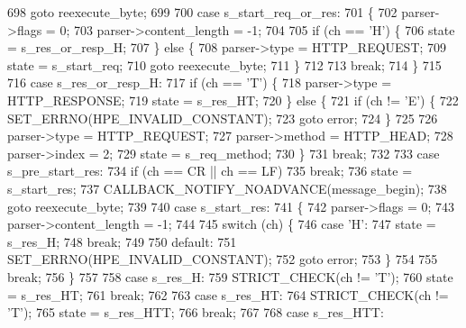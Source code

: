 \begin{DoxyCode}
698         \textcolor{keywordflow}{goto} reexecute\_byte;
699 
700       \textcolor{keywordflow}{case} s_start_req_or_res:
701       \{
702         parser->flags = 0;
703         parser->content_length = -1;
704 
705         \textcolor{keywordflow}{if} (ch == \textcolor{charliteral}{'H'}) \{
706           state = s_res_or_resp_H;
707         \} \textcolor{keywordflow}{else} \{
708           parser->type = HTTP_REQUEST;
709           state = s_start_req;
710           \textcolor{keywordflow}{goto} reexecute\_byte;
711         \}
712 
713         \textcolor{keywordflow}{break};
714       \}
715 
716       \textcolor{keywordflow}{case} s_res_or_resp_H:
717         \textcolor{keywordflow}{if} (ch == \textcolor{charliteral}{'T'}) \{
718           parser->type = HTTP_RESPONSE;
719           state = s_res_HT;
720         \} \textcolor{keywordflow}{else} \{
721           \textcolor{keywordflow}{if} (ch != \textcolor{charliteral}{'E'}) \{
722             SET_ERRNO(HPE_INVALID_CONSTANT);
723             \textcolor{keywordflow}{goto} error;
724           \}
725 
726           parser->type = HTTP_REQUEST;
727           parser->method = HTTP_HEAD;
728           parser->index = 2;
729           state = s_req_method;
730         \}
731         \textcolor{keywordflow}{break};
732 
733       \textcolor{keywordflow}{case} s_pre_start_res:
734         \textcolor{keywordflow}{if} (ch == CR || ch == LF)
735           \textcolor{keywordflow}{break};
736         state = s_start_res;
737         CALLBACK_NOTIFY_NOADVANCE(message\_begin);
738         \textcolor{keywordflow}{goto} reexecute\_byte;
739 
740       \textcolor{keywordflow}{case} s_start_res:
741       \{
742         parser->flags = 0;
743         parser->content_length = -1;
744 
745         \textcolor{keywordflow}{switch} (ch) \{
746           \textcolor{keywordflow}{case} \textcolor{charliteral}{'H'}:
747             state = s_res_H;
748             \textcolor{keywordflow}{break};
749 
750           \textcolor{keywordflow}{default}:
751             SET_ERRNO(HPE_INVALID_CONSTANT);
752             \textcolor{keywordflow}{goto} error;
753         \}
754 
755         \textcolor{keywordflow}{break};
756       \}
757 
758       \textcolor{keywordflow}{case} s_res_H:
759         STRICT_CHECK(ch != \textcolor{charliteral}{'T'});
760         state = s_res_HT;
761         \textcolor{keywordflow}{break};
762 
763       \textcolor{keywordflow}{case} s_res_HT:
764         STRICT_CHECK(ch != \textcolor{charliteral}{'T'});
765         state = s_res_HTT;
766         \textcolor{keywordflow}{break};
767 
768       \textcolor{keywordflow}{case} s_res_HTT:

\end{DoxyCode}
